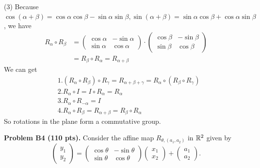 \documentclass[12pt]{article}
\begin{document}
\medskip
(3) Because $
\cos(\alpha + \beta) = \cos \alpha \cos \beta  - \sin \alpha \sin \beta,
\sin(\alpha + \beta) = \sin \alpha \cos \beta + \cos \alpha \sin \beta
$, we have 
\begin{align*}
R_{\alpha} \circ R_{\beta} &= 
\begin{pmatrix}
\cos\alpha & -\sin\alpha \\
\sin\alpha & \cos\alpha
\end{pmatrix} 
\cdot
\begin{pmatrix}
\cos\beta & -\sin\beta \\
\sin\beta & \cos\beta
\end{pmatrix} \\
&= R_{\beta} \circ R_{\alpha} 
= R_{\alpha + \beta}
\end{align*}
We can get 
\begin{align*}
&1. (R_{\alpha} \circ R_{\beta}) \circ R_{\gamma} = R_{\alpha + \beta + \gamma} = R_{\alpha} \circ (R_{\beta} \circ R_{\gamma}) \\
&2. R_{\alpha} \circ I = I \circ R_{\alpha} = R_{\alpha} \\
&3. R_{\alpha} \circ R_{-\alpha} = I \\
&4. R_{\alpha} \circ R_{\beta} = R_{\alpha + \beta} = R_{\beta} \circ R_{\alpha}
\end{align*}
So rotations in the plane form a commutative group.

\vspace {0.5cm}\noindent
{\bf Problem B4 (110 pts).}
Consider the affine map $R_{\theta, (a_1,a_2)}$ in $\mathbb{R}^2$ 
given by
\[
\begin{pmatrix}
y_1 \\
y_2
\end{pmatrix}
=
\begin{pmatrix}
\cos\theta & -\sin\theta \\
\sin\theta & \cos\theta
\end{pmatrix}
\begin{pmatrix}
x_1 \\
x_2
\end{pmatrix}
+ 
\begin{pmatrix}
a_1 \\
a_2
\end{pmatrix}.
\]
\end{document}
